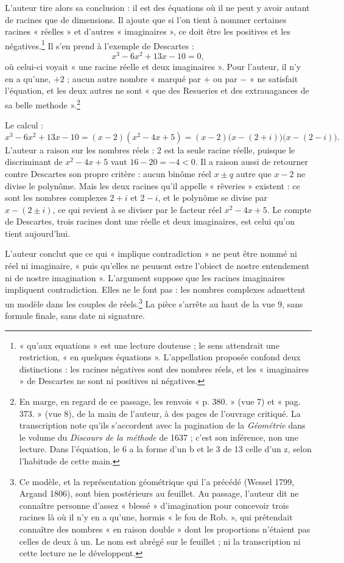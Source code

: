 \documentclass[11pt,a4paper]{article}
\begin{document}
L'auteur tire alors sa conclusion : il est des équations où il ne peut y avoir
autant de racines que de dimensions. Il ajoute que si l'on tient à nommer
certaines racines « réelles » et d'autres « imaginaires », ce doit être les
positives et les négatives.\footnote{« qu'aux equations » est une lecture
douteuse ; le sens attendrait une restriction, « en quelques équations ».
L'appellation proposée confond deux distinctions : les racines négatives sont
des nombres réels, et les « imaginaires » de Descartes ne sont ni positives ni
négatives.} Il s'en prend à l'exemple de Descartes :
\[
x^3-6x^2+13x-10=0,
\]
où celui-ci voyait « une racine réelle et deux imaginaires ». Pour l'auteur, il
n'y en a qu'une, \(+2\) ; aucun autre nombre « marqué par \(+\) ou par \(-\) »
ne satisfait l'équation, et les deux autres ne sont « que des Resueries et des
extrauagances de sa belle methode ».\footnote{En marge, en regard de ce
passage, les renvois « p. 380. » (vue 7) et « pag. 373. » (vue 8), de la main
de l'auteur, à des pages de l'ouvrage critiqué. La transcription note qu'ils
s'accordent avec la pagination de la \emph{Géométrie} dans le volume du
\emph{Discours de la méthode} de 1637 ; c'est son inférence, non une lecture.
Dans l'équation, le 6 a la forme d'un b et le 3 de 13 celle d'un z, selon
l'habitude de cette main.}

Le calcul :
\[
x^3-6x^2+13x-10=(x-2)(x^2-4x+5)=(x-2)\bigl(x-(2+i)\bigr)\bigl(x-(2-i)\bigr).
\]
L'auteur a raison sur les nombres réels : \(2\) est la seule racine réelle,
puisque le discriminant de \(x^2-4x+5\) vaut \(16-20=-4<0\). Il a raison aussi
de retourner contre Descartes son propre critère : aucun binôme réel
\(x\pm q\) autre que \(x-2\) ne divise le polynôme. Mais les deux racines qu'il
appelle « rêveries » existent : ce sont les nombres complexes \(2+i\) et
\(2-i\), et le polynôme se divise par \(x-(2\pm i)\), ce qui revient à se
diviser par le facteur réel \(x^2-4x+5\). Le compte de Descartes, trois racines
dont une réelle et deux imaginaires, est celui qu'on tient aujourd'hui.

L'auteur conclut que ce qui « implique contradiction » ne peut être nommé ni
réel ni imaginaire, « puis qu'elles ne peuuent estre l'obiect de nostre
entendement ni de nostre imagination ». L'argument suppose que les racines
imaginaires impliquent contradiction. Elles ne le font pas : les nombres
complexes admettent un modèle dans les couples de réels.\footnote{Ce modèle,
et la représentation géométrique qui l'a précédé (Wessel 1799, Argand 1806),
sont bien postérieurs au feuillet. Au passage, l'auteur dit ne connaître
personne d'assez « blessé » d'imagination pour concevoir trois racines là où il
n'y en a qu'une, hormis « le fou de Rob. », qui prétendait connaître des nombres
« en raison double » dont les proportions n'étaient pas celles de deux à un. Le
nom est abrégé sur le feuillet ; ni la transcription ni cette lecture ne le
développent.} La pièce s'arrête au haut de la vue 9, sans formule finale, sans
date ni signature.
\end{document}
